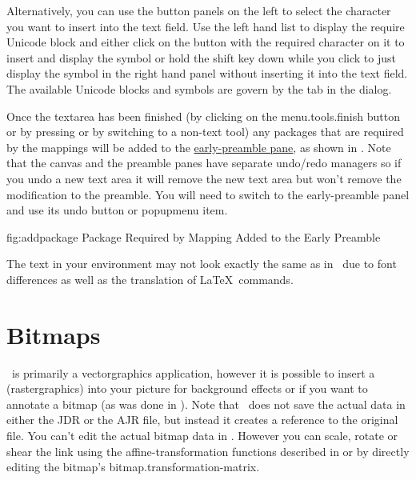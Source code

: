 Alternatively, you can use the button panels on the left to
select the character you want to insert into the text field. Use the
left hand list to display the require Unicode block and either click
on the button with the required character on it to insert and
display the symbol or hold the shift key down while you click to
just display the symbol in the right hand panel without inserting it
into the text field. The available Unicode blocks and symbols are govern by the
 tab in the  dialog.

Once the \gls{textarea} has been finished (by clicking on the
\gls{menu.tools.finish} button or by pressing
 or by switching to a non-text
tool) any packages that are required by the mappings will be added
to the \hyperref[sec:preamble]{early-preamble pane}, as shown in
.  Note that the \gls{canvas} and the
preamble panes have separate undo\slash redo managers so if you undo
a new text area it will remove the new text area but won't remove
the modification to the preamble. You will need to switch to the
early-preamble panel and use its undo button or \gls{popupmenu} item.

\FloatFig
  {fig:addpackage}
  {}
  {Package Required by Mapping Added to the Early Preamble}

\begin{important}
The text in your  environment may not
look exactly the same as in \FlowframTk\ due to font differences as
well as the translation of \LaTeX\ commands.
\end{important}


\section{Bitmaps}\label{sec:insertbitmap}


\FlowframTk\ is primarily a \gls{vectorgraphics} application,
however it is possible to insert a 
(\gls{rastergraphics}) into your picture for background effects or
if you want to annotate a \gls{bitmap} (as was done in
).  Note that
\FlowframTk\ does not save the actual  data in either
the \gls{JDR} or the \gls{AJR} file, but instead it creates a reference
to the original file. You can't edit the actual bitmap data in
\FlowframTk. However you can scale, rotate or shear the link
using the \gls{affine-transformation} functions described in 
 or by directly editing the
bitmap's \gls{bitmap.transformation-matrix}. 

